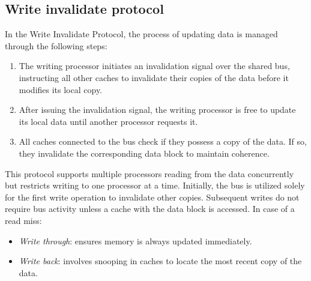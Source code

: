 \subsection{Write invalidate protocol}
In the Write Invalidate Protocol, the process of updating data is managed through the following steps:
\begin{enumerate}
    \item The writing processor initiates an invalidation signal over the shared bus, instructing all other caches to invalidate their copies of the data before it modifies its local copy. 
    \item After issuing the invalidation signal, the writing processor is free to update its local data until another processor requests it.
    \item All caches connected to the bus check if they possess a copy of the data. If so, they invalidate the corresponding data block to maintain coherence.
\end{enumerate}
This protocol supports multiple processors reading from the data concurrently but restricts writing to one processor at a time.
Initially, the bus is utilized solely for the first write operation to invalidate other copies. 
Subsequent writes do not require bus activity unless a cache with the data block is accessed.
In case of a read miss:
\begin{itemize}
    \item \textit{Write through}: ensures memory is always updated immediately.
    \item \textit{Write back}: involves snooping in caches to locate the most recent copy of the data.
\end{itemize}

